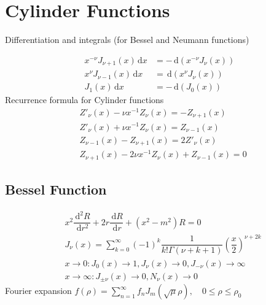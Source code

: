 \documentclass[10pt, a4paper, twocolumn]{article}
\def\d{\,\mathrm{d}}
\begin{document}
\section{Cylinder Functions}
	Differentiation and integrals (for Bessel and Neumann functions)
	
	\begin{align*}
		x^{-\nu} J_{\nu+1}(x)\d x &= -\d \left(x^{-\nu} J_\nu(x)\right)\\
		x^\nu J_{\nu-1}(x)\d x &= \d \left(x^\nu J_\nu(x)\right)\\
		J_1(x)\d x &= -\d (J_0(x))
	\end{align*}
	Recurrence formula for Cylinder functions
	\begin{align*}
		&Z'_\nu(x) - \nu x^{-1}Z_\nu(x) = -Z_{\nu+1}(x)\\
		&Z'_\nu(x) + \nu x^{-1}Z_\nu(x) = Z_{\nu-1}(x)\\
		&Z_{\nu-1}(x) - Z_{\nu+1}(x) = 2Z'_\nu(x)\\
		&Z_{\nu+1}(x) - 2\nu x^{-1} Z_\nu(x) + Z_{\nu-1}(x) = 0
	\end{align*}

\subsection{Bessel Function}

	\begin{align*}
		&x^2\dfrac{\d^2 R}{\d r^2} + 2r\dfrac{\d R}{\d r} + (x^2 - m^2)R=0\\
		&J_\nu(x) = \sum^\infty_{k=0}(-1)^k\dfrac{1}{k!\Gamma(\nu+k+1)}\left(\dfrac{x}{2}\right)^{\nu+2k}\\
		&x\rightarrow 0: J_0(x)\rightarrow 1, J_\nu(x) \rightarrow 0, J_{-\nu}(x) \rightarrow \infty\\
		&x\rightarrow \infty: J_{\pm\nu}(x)\rightarrow 0, N_\nu(x)\rightarrow 0
	\end{align*}
	Fourier expansion $f(\rho) = \displaystyle\sum^\infty_{n=1}f_nJ_m(\sqrt{\mu}\rho), 
		\quad 0 \leq \rho \leq \rho_0$
	
\end{document}
